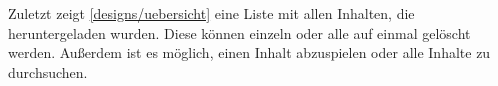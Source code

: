 

Zuletzt zeigt \autoref{designs/uebersicht} eine Liste mit allen Inhalten, die heruntergeladen wurden. Diese können einzeln oder alle auf einmal gelöscht werden. Außerdem ist es möglich, einen Inhalt abzuspielen oder alle Inhalte zu durchsuchen.

